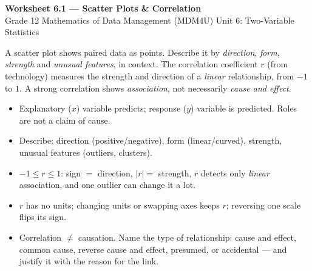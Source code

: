 \documentclass[11pt]{article}
\begin{document}
\begin{center}
{\LARGE\bfseries\color{titleblue}Worksheet 6.1 --- Scatter Plots \& Correlation}\\[2pt]
{\small Grade 12 Mathematics of Data Management (MDM4U) \textperiodcentered{} Unit 6: Two-Variable Statistics}
\end{center}

\begin{ideabox}
A scatter plot shows paired data as points. Describe it by \emph{direction}, \emph{form}, \emph{strength} and \emph{unusual features}, in context. The correlation coefficient $r$ (from technology) measures the strength and direction of a \emph{linear} relationship, from $-1$ to $1$. A strong correlation shows \emph{association}, not necessarily \emph{cause and effect}.
\begin{itemize}[leftmargin=*,itemsep=2pt]
  \item Explanatory ($x$) variable predicts; response ($y$) variable is predicted. Roles are not a claim of cause.
  \item Describe: direction (positive/negative), form (linear/curved), strength, unusual features (outliers, clusters).
  \item $-1\le r\le1$: sign $=$ direction, $|r|=$ strength, $r$ detects only \emph{linear} association, and one outlier can change it a lot.
  \item $r$ has no units; changing units or swapping axes keeps $r$; reversing one scale flips its sign.
  \item Correlation $\ne$ causation. Name the type of relationship: cause and effect, common cause, reverse cause and effect, presumed, or accidental --- and justify it with the reason for the link.
\end{itemize}
\end{ideabox}
\end{document}
